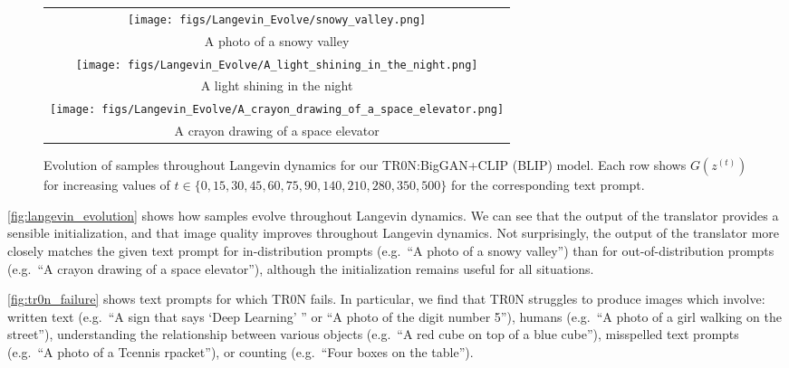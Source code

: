 \documentclass[nohyperref]{article}
\theoremstyle{plain}
\theoremstyle{definition}
\theoremstyle{remark}
\begin{document}
\begin{figure*} [t!]
\centering
\fontsize{7.5}{9}
\selectfont
\hspace*{-0.3cm}
\begin{tabular}
{c}
   \texttt{[image: figs/Langevin\_Evolve/snowy\_valley.png]} \\[-0.05cm]
   A photo of a snowy valley \\[0.1cm]
   \texttt{[image: figs/Langevin\_Evolve/A\_light\_shining\_in\_the\_night.png]} \\[-0.05cm]
   A light shining in the night \\[0.1cm]
   \texttt{[image: figs/Langevin\_Evolve/A\_crayon\_drawing\_of\_a\_space\_elevator.png]} \\[-0.05cm]
   A crayon drawing of a space elevator
\end{tabular}
\caption{Evolution of samples throughout Langevin dynamics for our TR0N:BigGAN+CLIP (BLIP) model. Each row shows $G(z^{(t)})$ for increasing values of $t \in \{0, 15, 30, 45, 60, 75, 90, 140, 210, 280, 350, 500\}$ for the corresponding text prompt.}
\label{fig:langevin_evolution}
\end{figure*}







\autoref{fig:langevin_evolution} shows how samples evolve throughout Langevin dynamics. We can see that the output of the translator provides a sensible initialization, and that image quality improves throughout Langevin dynamics. Not surprisingly, the output of the translator more closely matches the given text prompt for in-distribution prompts (e.g.\ ``A photo of a snowy valley'') than for out-of-distribution prompts (e.g.\ ``A crayon drawing of a space elevator''), although the initialization remains useful for all situations.

\autoref{fig:tr0n_failure} shows text prompts for which TR0N fails. In particular, we find that TR0N struggles to produce images which involve: written text (e.g.\ ``A sign that says `Deep Learning' '' or ``A photo of the digit number 5''), humans (e.g.\ ``A photo of a girl walking on the street''), understanding the relationship between various objects (e.g.\ ``A red cube on top of a blue cube''), misspelled text prompts (e.g.\ ``A photo of a Tcennis rpacket''), or counting (e.g.\ ``Four boxes on the table'').
\end{document}
